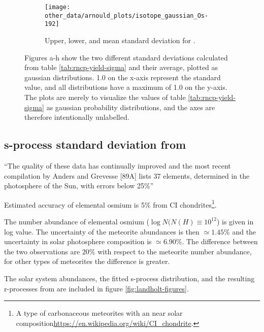 \begin{figure}
\begin{subfigure}{\subfiglength}
  \end{subfigure}
  \begin{subfigure}{\subfiglength}
    \centering
    \texttt{[image: other\_data/arnould\_plots/isotope\_gaussian\_Os-192]}
    \caption{Upper, lower, and mean standard deviation for .}
  \end{subfigure}
  \caption{\label{fig:arnould-gauss-dist}
    Figures a-h show the two different standard deviations calculated from table \ref{tab:rncp-yield-sigma} and their average, plotted as gaussian distributions.
    1.0 on the x-axis represent the standard value, and all distributions have a maximum of 1.0 on the y-axis.
    The plots are merely to visualize the values of table \ref{tab:rncp-yield-sigma} as gaussian probability distributions, and the axes are therefore intentionally unlabelled.
  }
\end{figure}
\FloatBarrier

\subsection{s-process standard deviation from \cite{landolt93}}
``The quality of these data has continually improved and the most recent compilation by
Anders and Grevesse [89A] lists 37 elements, determined in the photosphere of the Sun, with errors below
25\%''\cite[p.197]{landolt93}

Estimated accuracy of elemental osmium is 5\% from CI chondrites\footnote{A type of carbonaceous meteorites with an near solar composition\url{https://en.wikipedia.org/wiki/CI_chondrite}.}\cite[table2, p.203]{landolt93}.

The number abundance of elemental osmium ($\log N(N(H)\equiv 10^{12}$) is given in log value. The uncertainty of the meteorite abundances is then $\simeq 1.45\%$ and the uncertainty in solar photosphere composition is $\simeq 6.90\%$. The difference between the two observations are $20\%$ with respect to the meteorite number abundance\cite[table3, p.205]{landolt93}, for other types of meteorites the difference is greater.

The solar system abundances, the fitted s-process distribution, and the resulting r-processes from \cite{landolt93} are included in figure \ref{fig:landholt-figures}.

